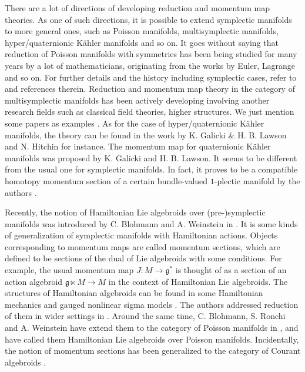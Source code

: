 \documentclass[a4paper,11pt,dvipdfmx]{article}
\numberwithin{equation}{section}
\begin{document}
There are a lot of directions of developing reduction and momentum map theories. 
As one of such directions, it is possible to extend symplectic manifolds to more general ones, 
such as Poisson manifolds, multisymplectic manifolds, hyper/quaternionic K\"{a}hler manifolds and so on. 
It goes without saying that reduction of Poisson manifolds with symmetries has been being 
studied for many years by a lot of mathematicians, originating from the works by Euler, Lagrange and so on. 
For further details and the history including symplectic cases, refer to \cite{MWsom01, ORmom04} and references therein. 
Reduction and momentum map theory in the category of multisymplectic manifolds has been actively developing involving another research fields 
such as classical field theories, higher structures. We just mention some papers as examples \cite{Bred21,BMR22,CFRZhom16}. 
As for the case of hyper/quaternionic K\"{a}hler manifolds, the theory can be found in the work by K. Galicki \& H. B. Lawson and N. Hitchin 
\cite{Ggene87, GLqua88, HKLR87} for instance. 
The momentum map for quaternionic K\"{a}hler manifolds was proposed by K. Galicki and H. B. Lawson. It seems to be different from the usual one for symplectic manifolds. 
In fact, it proves to be a compatible homotopy momentum section of a certain bundle-valued $1$-plectic manifold by the authors \cite{HIgeo24}. 

Recently, the notion of Hamiltonian Lie algebroids over (pre-)symplectic manifolds was introduced by C. Blohmann and A. Weinstein in \cite{BWham18}. 
It is some kinds of generalization of symplectic manifolds with Hamiltonian actions. Objects corresponding to momentum maps are called momentum sections, which are defined to be 
sections of the dual of Lie algebroids with some conditions. For example, the usual momentum map $J:M\to \mathfrak{g}^*$ is thought of as a section of an action algebroid 
$\mathfrak{g}\ltimes M\to M$ in the context of Hamiltonian Lie algebroids. 
The structures of Hamiltonian algebroids can be found in some Hamiltonian mechanics and gauged nonlinear sigma models \cite{HIhom22,Imom19}. 
The authors addressed reduction of them in wider settings in \cite{HIgeo24}. 
Around the same time, C. Blohmann, S. Ronchi and A. Weinstein have extend them to the category of Poisson manifolds in \cite{BRWham23}, and have called them 
Hamiltonian Lie algebroids over Poisson manifolds. 
Incidentally, the notion of momentum sections has been generalized to the category of Courant algebroids \cite{Imom21}.
\end{document}
